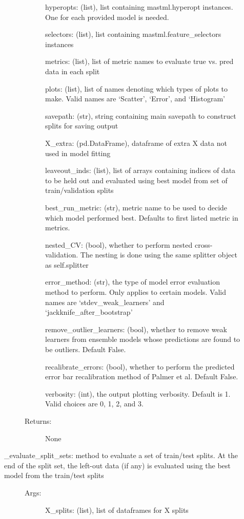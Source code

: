 \documentclass[letterpaper,10pt,english]{sphinxmanual}
\begin{document}
\begin{fulllineitems}
\begin{description}
\begin{description}
\begin{description}
hyperopts: (list), list containing mastml.hyperopt instances. One for each provided model is needed.

selectors: (list), list containing mastml.feature\_selectors instances

metrics: (list), list of metric names to evaluate true vs. pred data in each split

plots: (list), list of names denoting which types of plots to make. Valid names are ‘Scatter’, ‘Error’, and ‘Histogram’

savepath: (str), string containing main savepath to construct splits for saving output

X\_extra: (pd.DataFrame), dataframe of extra X data not used in model fitting

leaveout\_inds: (list), list of arrays containing indices of data to be held out and evaluated using best model from set of train/validation splits

best\_run\_metric: (str), metric name to be used to decide which model performed best. Defaults to first listed metric in metrics.

nested\_CV: (bool), whether to perform nested cross-validation. The nesting is done using the same splitter object as self.splitter

error\_method: (str), the type of model error evaluation method to perform. Only applies to certain models. Valid names are ‘stdev\_weak\_learners’ and ‘jackknife\_after\_bootstrap’

remove\_outlier\_learners: (bool), whether to remove weak learners from ensemble models whose predictions are found to be outliers. Default False.

recalibrate\_errors: (bool), whether to perform the predicted error bar recalibration method of Palmer et al. Default False.

verbosity: (int), the output plotting verbosity. Default is 1. Valid choices are 0, 1, 2, and 3.

\item[{Returns:}] \leavevmode
None

\end{description}

\item[{\_evaluate\_split\_sets: method to evaluate a set of train/test splits. At the end of the split set, the left-out data (if any) is evaluated using the best model from the train/test splits}] \leavevmode\begin{description}
\item[{Args:}] \leavevmode
X\_splits: (list), list of dataframes for X splits


\end{description}
\end{description}
\end{description}
\end{fulllineitems}
\end{document}
